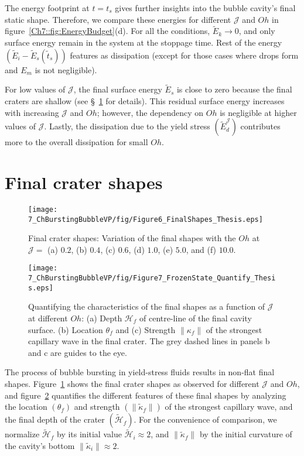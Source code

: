 The energy footprint at $t = t_s$ gives further insights into the bubble cavity's final static shape. Therefore, we compare these energies for different $\mathcal{J}$ and $Oh$ in figure~\ref{Ch7::fig:EnergyBudget}(d). For all the conditions, $\tilde E_k \to 0$, and only surface energy remain in the system at the stoppage time. Rest of the energy $\left(\tilde E_i - \tilde E_s(\tilde t_s)\right)$ features as dissipation (except for those cases where drops form and $E_m$ is not negligible). 

For low values of $\mathcal{J}$, the final surface energy $\tilde E_s$ is close to zero because the final craters are shallow (see \S~\ref{Sec::EquilibriumStates} for details). This residual surface energy increases with increasing $\mathcal{J}$ and $Oh$; however, the dependency on $Oh$ is negligible at higher values of $\mathcal{J}$. Lastly, the dissipation due to the yield stress $\left(\tilde E_d^\mathcal{J}\right)$ contributes more to the overall dissipation for small $Oh$.

\section{Final crater shapes}\label{Sec::EquilibriumStates}

\begin{figure}
	\centering
	\texttt{[image: 7\_ChBurstingBubbleVP/fig/Figure6\_FinalShapes\_Thesis.eps]}
	\caption{Final crater shapes: Variation of the final shapes with the $Oh$ at $\mathcal{J} =$ (a) $0.2$, (b) $0.4$, (c) $0.6$, (d) $1.0$, (e) $5.0$, and (f) $10.0$.}
	\label{Ch7::fig:Zoo_of_Final_Shapes}
\end{figure}

\begin{figure}
	\centering
	\texttt{[image: 7\_ChBurstingBubbleVP/fig/Figure7\_FrozenState\_Quantify\_Thesis.eps]}
	\caption{Quantifying the characteristics of the final shapes as a function of $\mathcal{J}$ at different $Oh$: (a) Depth $\mathcal{H}_f$ of centre-line of the final cavity surface. (b) Location $\theta_f$ and (c) Strength $\|\kappa_f\|$ of the strongest capillary wave in the final crater. The grey dashed lines in panels b and c are guides to the eye.}
	\label{Ch7::fig:Quantification_Final_Shapes}
\end{figure}

The process of bubble bursting in yield-stress fluids results in non-flat final shapes.
Figure~\ref{Ch7::fig:Zoo_of_Final_Shapes} shows the final crater shapes as observed for different $\mathcal{J}$ and $Oh$, and figure~\ref{Ch7::fig:Quantification_Final_Shapes} quantifies the different features of these final shapes by analyzing the location $\left(\theta_f\right)$ and strength $\left(\|\tilde \kappa_f\|\right)$ of the strongest capillary wave, and the final depth of the crater $\left(\tilde{\mathcal{H}}_f\right)$. For the convenience of comparison, we normalize $\tilde{\mathcal{H}}_f$ by its initial value $\tilde{\mathcal{H}}_i \approx 2$, and $\|\tilde \kappa_f\|$ by the initial curvature of the cavity's bottom $\|\tilde \kappa_i\| \approx 2$. 


